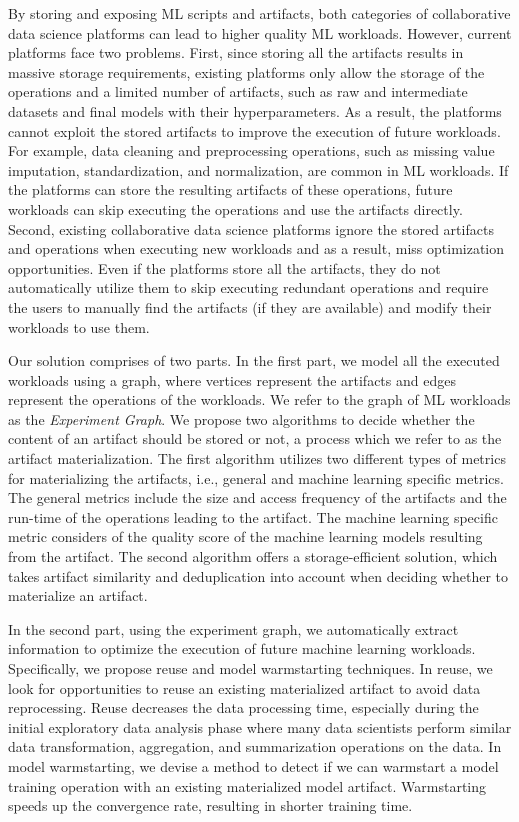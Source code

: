 By storing and exposing ML scripts and artifacts, both categories of collaborative data science platforms can lead to higher quality ML workloads.
However, current platforms face two problems.
First, since storing all the artifacts results in massive storage requirements, existing platforms only allow the storage of the operations and a limited number of artifacts, such as raw and intermediate datasets and final models with their hyperparameters.
As a result, the platforms cannot exploit the stored artifacts to improve the execution of future workloads.
For example, data cleaning and preprocessing operations, such as missing value imputation, standardization, and normalization, are common in ML workloads.
If the platforms can store the resulting artifacts of these operations, future workloads can skip executing the operations and use the artifacts directly. 
Second, existing collaborative data science platforms ignore the stored artifacts and operations when executing new workloads and as a result, miss optimization opportunities.
Even if the platforms store all the artifacts, they do not automatically utilize them to skip executing redundant operations and require the users to manually find the artifacts (if they are available) and modify their workloads to use them.

Our solution comprises of two parts.
In the first part, we model all the executed workloads using a graph, where vertices represent the artifacts and edges represent the operations of the workloads.
We refer to the graph of ML workloads as the \textit{Experiment Graph}.
We propose two algorithms to decide whether the content of an artifact should be stored or not, a process which we refer to as the artifact materialization.
The first algorithm utilizes two different types of metrics for materializing the artifacts, i.e., general and machine learning specific metrics.
The general metrics include the size and access frequency of the artifacts and the run-time of the operations leading to the artifact.
The machine learning specific metric considers of the quality score of the machine learning models resulting from the artifact.
The second algorithm offers a storage-efficient solution, which takes artifact similarity and deduplication into account when deciding whether to materialize an artifact.

In the second part, using the experiment graph, we automatically extract information to optimize the execution of future machine learning workloads.
Specifically, we propose reuse and model warmstarting techniques.
In reuse, we look for opportunities to reuse an existing materialized artifact to avoid data reprocessing.
Reuse decreases the data processing time, especially during the initial exploratory data analysis phase where many data scientists perform similar data transformation, aggregation, and summarization operations on the data.
In model warmstarting, we devise a method to detect if we can warmstart a model training operation with an existing materialized model artifact.
Warmstarting speeds up the convergence rate, resulting in shorter training time. 


